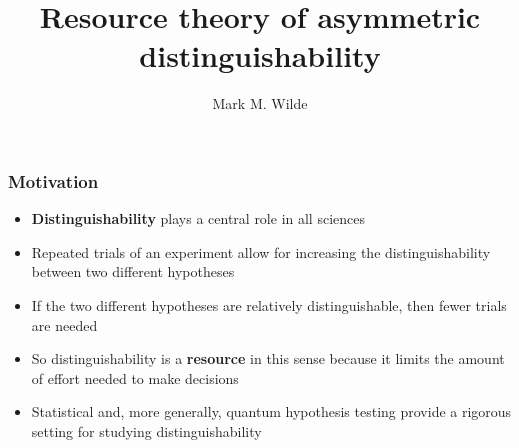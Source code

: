 \documentclass[usenames,dvipsnames,handout]{beamer}
\title[]{Resource theory of asymmetric distinguishability} %
\author{Mark M. Wilde} %
\institute[LSU] %
{
Hearne Institute for Theoretical Physics,\\
Department of Physics and Astronomy,\\
Center for Computation and Technology,\\
Louisiana State University,\\
Baton Rouge, Louisiana, USA \\ %
\medskip
\textit{mwilde@gmail.com}\\ %
\bigskip
Based on arXiv:1905.11629, arXiv:1907.06306\\
 with Xin Wang (University of Maryland and Baidu, Inc.) \\
\bigskip
\bigskip
}
\date{} %
\begin{document}
\begin{frame}
\titlepage %
\end{frame}

\begin{frame}
\frametitle{Motivation} %


\begin{itemize}
\item<2-> {\color{MidnightBlue}\textbf{Distinguishability}} plays a central role in all sciences
\vspace{.1in}
\item<3-> Repeated trials of an experiment allow for increasing the distinguishability between two different hypotheses
\vspace{.1in}
\item<4-> If the two different hypotheses are relatively distinguishable, then fewer trials are needed
\vspace{.1in}
\item<5-> So distinguishability is a {\color{MidnightBlue}\textbf{resource}} in this sense because it limits the amount of effort needed to make decisions
\vspace{.1in}
\item<6-> Statistical and, more generally, quantum hypothesis testing provide a rigorous setting for studying distinguishability
\end{itemize}

\end{frame}
\end{document}
